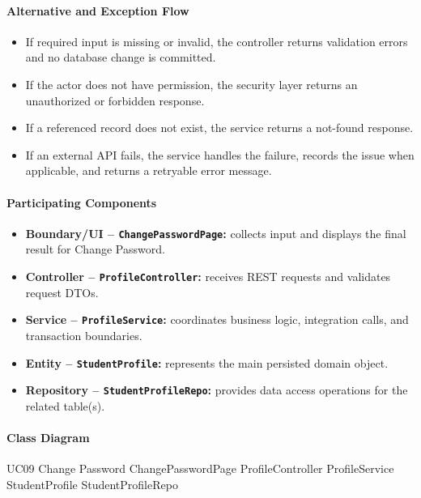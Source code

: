 \paragraph{Alternative and Exception Flow}

\begin{itemize}
    \item If required input is missing or invalid, the controller returns validation errors and no database change is committed.
    \item If the actor does not have permission, the security layer returns an unauthorized or forbidden response.
    \item If a referenced record does not exist, the service returns a not-found response.
    \item If an external API fails, the service handles the failure, records the issue when applicable, and returns a retryable error message.
\end{itemize}

\paragraph{Participating Components}

\begin{itemize}
    \item \textbf{Boundary/UI -- \texttt{ChangePasswordPage}:} collects input and displays the final result for Change Password.
    \item \textbf{Controller -- \texttt{ProfileController}:} receives REST requests and validates request DTOs.
    \item \textbf{Service -- \texttt{ProfileService}:} coordinates business logic, integration calls, and transaction boundaries.
    \item \textbf{Entity -- \texttt{StudentProfile}:} represents the main persisted domain object.
    \item \textbf{Repository -- \texttt{StudentProfileRepo}:} provides data access operations for the related table(s).
\end{itemize}

\paragraph{Class Diagram}

\ClassDiagram
{UC09 Change Password}
{ChangePasswordPage}
{ProfileController}
{ProfileService}
{StudentProfile}
{StudentProfileRepo}

